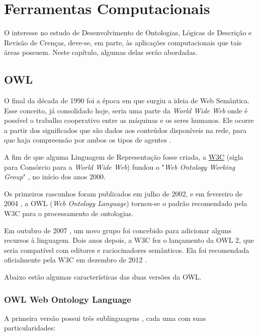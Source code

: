 \chapter{Ferramentas Computacionais}

\lettrine{O}{} interesse no estudo de Desenvolvimento de Ontologias, Lógicas de Descrição e Revisão de Crenças, deve-se, em parte, às aplicações computacionais que tais áreas possuem. Neste capítulo, algumas delas serão abordadas.

\section{OWL}

O final da década de 1990 foi a época em que surgiu a ideia de Web Semântica. Esse conceito, já consolidado hoje, seria uma parte da \textit{World Wide Web} onde é possível o trabalho cooperativo entre as máquinas e os seres humanos. Ele ocorre a partir dos significados que são dados aos conteúdos disponíveis na rede, para que haja compreensão por ambos os tipos de agentes \cite{ferramentasHerman}.

A fim de que alguma Linguagem de Representação fosse criada, a \href{https://www.w3.org}{W3C} (sigla para Consórcio para a \textit{World Wide Web}) fundou o "\textit{Web Ontology Working Group}" \cite{ferramentasGrupo}, no início dos anos 2000. 

Os primeiros rascunhos foram publicados em julho de 2002, e em fevereiro de 2004 \cite{ferramentasReco}, a OWL (\textit{Web Ontology Language}) tornou-se o padrão recomendado pela W3C para o processamento de ontologias.

Em outubro de 2007 \cite{ferramentasOWLGrupo2}, um novo grupo foi concebido para adicionar alguns recursos à linguagem. Dois anos depois, a W3C fez o lançamento da OWL 2, que seria compatível com editores e raciocinadores semânticos. Ela foi recomendada oficialmente pela W3C em dezembro de 2012 \cite{ferramentasOWLReco2}.

Abaixo estão algumas características das duas versões da OWL.

\subsection{OWL Web Ontology Language}

A primeira versão possui três sublinguagens \cite{ferramentasOWL1}, cada uma com suas particularidades:

